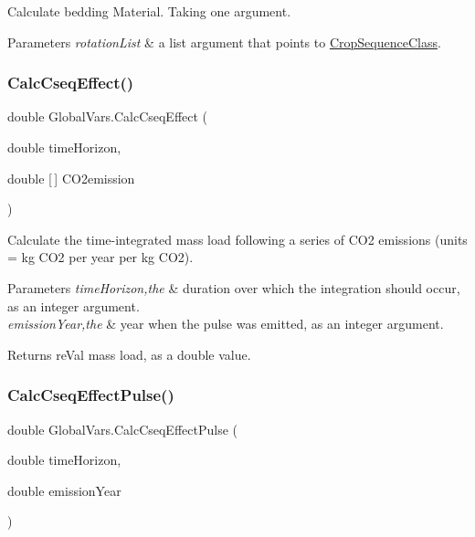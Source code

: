 Calculate bedding Material. Taking one argument. 


\begin{DoxyParams}{Parameters}
{\em rotation\+List} & a list argument that points to \mbox{\hyperlink{class_crop_sequence_class}{Crop\+Sequence\+Class}}. \\
\hline
\end{DoxyParams}
\mbox{\label{class_global_vars_a4ff00f80fd4199c713d481bae6213d96}} 
\subsubsection{\texorpdfstring{CalcCseqEffect()}{CalcCseqEffect()}}
{\footnotesize\ttfamily double Global\+Vars.\+Calc\+Cseq\+Effect (\begin{DoxyParamCaption}\item[{double}]{time\+Horizon,  }\item[{double \mbox{[}$\,$\mbox{]}}]{C\+O2emission }\end{DoxyParamCaption})\hspace{0.3cm}{\ttfamily [inline]}}



Calculate the time-\/integrated mass load following a series of C\+O2 emissions (units = kg C\+O2 per year per kg C\+O2). 


\begin{DoxyParams}{Parameters}
{\em time\+Horizon,the} & duration over which the integration should occur, as an integer argument. \\
\hline
{\em emission\+Year,the} & year when the pulse was emitted, as an integer argument. \\
\hline
\end{DoxyParams}
\begin{DoxyReturn}{Returns}
re\+Val mass load, as a double value. 
\end{DoxyReturn}
\mbox{\label{class_global_vars_a04a94dd0bc66a17669168de6a5dee129}} 
\subsubsection{\texorpdfstring{CalcCseqEffectPulse()}{CalcCseqEffectPulse()}}
{\footnotesize\ttfamily double Global\+Vars.\+Calc\+Cseq\+Effect\+Pulse (\begin{DoxyParamCaption}\item[{double}]{time\+Horizon,  }\item[{double}]{emission\+Year }\end{DoxyParamCaption})\hspace{0.3cm}{\ttfamily [inline]}}



